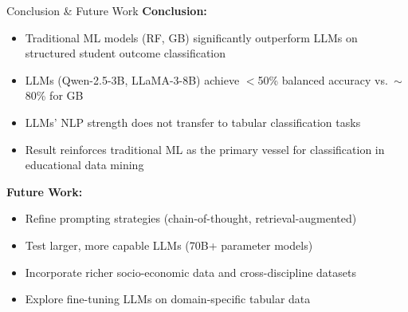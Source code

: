 \documentclass[aspectratio=169]{beamer}
\begin{document}
\begin{frame}{Conclusion \& Future Work}
\textbf{Conclusion:}
\begin{itemize}
    \item Traditional ML models (RF, GB) significantly outperform LLMs on structured student outcome classification
    \item LLMs (Qwen-2.5-3B, LLaMA-3-8B) achieve $<$50\% balanced accuracy vs.\ $\sim$80\% for GB
    \item LLMs' NLP strength does not transfer to tabular classification tasks
    \item Result reinforces traditional ML as the primary vessel for classification in educational data mining
\end{itemize}

\vspace{0.4cm}
\textbf{Future Work:}
\begin{itemize}
    \item Refine prompting strategies (chain-of-thought, retrieval-augmented)
    \item Test larger, more capable LLMs (70B+ parameter models)
    \item Incorporate richer socio-economic data and cross-discipline datasets
    \item Explore fine-tuning LLMs on domain-specific tabular data
\end{itemize}
\end{frame}
\end{document}
